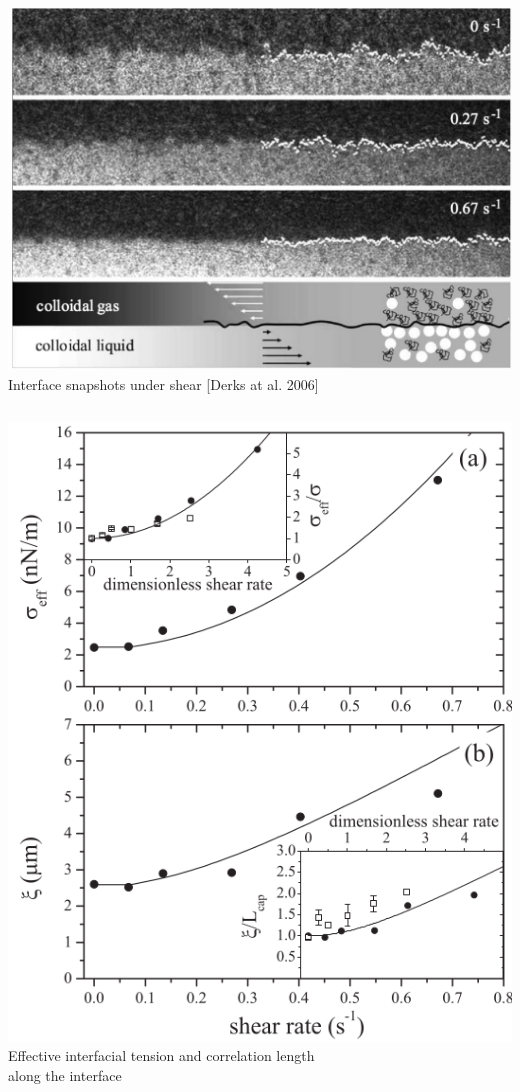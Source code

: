 \documentclass[9pt, dvipsnames]{beamer} %
\begin{document}
\begin{frame}
\begin{overprint}
\begin{columns}
	    \includegraphics[width=\linewidth]{derks.png} 
	    Interface snapshots under shear [Derks at al. 2006]
	    \end{columns}
	    \begin{columns}
	    \includegraphics[width=0.9\linewidth]{derks-results.png}
	    \centering
		{\footnotesize  Effective interfacial tension and correlation length \\ along the interface}

\end{columns}
\end{overprint}
\end{frame}
\end{document}
